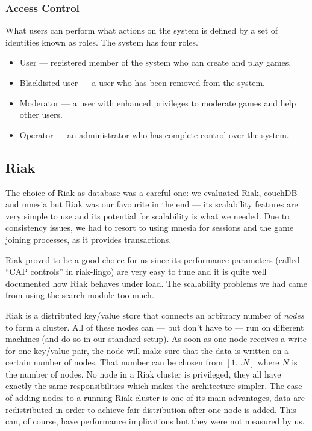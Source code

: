 \documentclass[11pt,a4paper]{report}
\begin{document}
\subsubsection{Access Control}
What users can perform what actions on the system is defined by a set of
identities known as roles. The system has four roles.

\begin{itemize}
\item User --- registered member of the system who can create and play games.
\item Blacklisted user --- a user who has been removed from the system.
\item Moderator --- a user with enhanced privileges to moderate games and help
other users.
\item Operator --- an administrator who has complete control over the system.

\end{itemize}


\subsection{Riak}
\label{sec:riak}
The choice of Riak as database was a careful one: we evaluated Riak, couchDB
and mnesia but Riak was our favourite in the end --- its scalability features
are very simple to use and its potential for scalability is what we needed.
Due to consistency issues, we had to resort to using mnesia for sessions and
the game joining processes, as it provides transactions.

Riak proved to be a good choice for us since its performance parameters (called
``CAP controls''\cite{cap_controls} in riak-lingo) are very easy to tune and it
is quite well documented how Riak behaves under load. The scalability problems
we had came from using the search module too much.

Riak is a distributed key/value store that connects an arbitrary number of
{\em nodes} to form a cluster. All of these nodes can --- but don't have to ---
run on different machines (and do so in our standard setup). As soon as one
node receives a write for one key/value pair, the node will make sure that the
data is written on a certain number of nodes. That number can be chosen from
$[1 \ldots N]$ where $N$ is the number of nodes.
No node in a Riak cluster is privileged, they all have exactly the same
responsibilities which makes the architecture simpler.
The ease of adding nodes to a running Riak cluster is one of its main
advantages, data are redistributed in order to achieve fair distribution after
one node is added. This can, of course, have performance implications but they
were not measured by us.
\end{document}
